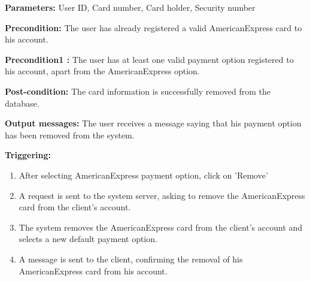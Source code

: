 \begin{description}

\item \textbf{Parameters:} User ID, Card number, Card holder, Security number

\item \textbf{Precondition:} The user has already registered a valid
AmericanExpress card to his account.
\item \textbf{Precondition1 :} The user has at least one valid payment option
registered to his account, apart from the AmericanExpress option.

\item \textbf{Post-condition:} The card information is successfully removed from
the database.

\item \textbf{Output messages:} The user receives a message saying that his
payment option has been removed from the system.

\item \textbf{Triggering:}
\begin{enumerate}
\item After selecting AmericanExpress payment option, click on 'Remove'

\item A request is sent to the system server, asking to remove the AmericanExpress card
from the client's account.

\item The system removes the AmericanExpress card from the client's account and selects a
new default payment option.

\item A message is sent to the client, confirming the removal of his AmericanExpress
card from his account.

\end{enumerate}

\end{description}